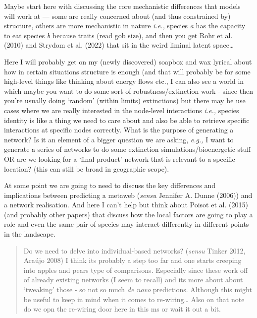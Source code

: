 \documentclass[
]{agujournal2019}
\begin{document}
Maybe start here with discussing the core mechanistic differences that
models will work at --- some are really concerned about (and thus
constrained by) structure, others are more mechanistic in nature
\emph{i.e.,} species \emph{a} has the capacity to eat species \emph{b}
because traits (read gob size), and then you get Rohr et al. (2010) and
Strydom et al. (2022) that sit in the weird liminal latent space\ldots{}

Here I will probably get on my (newly discovered) soapbox and wax
lyrical about how in certain situations structure is enough (and that
will probably be for some high-level things like thinking about energy
flows etc., I can also see a world in which maybe you want to do some
sort of robustness/extinction work - since then you're usually doing
`random' (within limits) extinctions) but there may be use cases where
we are really interested in the node-level interactions \emph{i.e.,}
species identity is like a thing we need to care about and also be able
to retrieve specific interactions at specific nodes correctly. What is
the purpose of generating a network? Is it an element of a bigger
question we are asking, \emph{e.g.,} I want to generate a series of
networks to do some extinction simulations/bioenergetic stuff OR are we
looking for a `final product' network that is relevant to a specific
location? (this can still be broad in geographic scope).

At some point we are going to need to discuss the key differences and
implications between predicting a metaweb (\emph{sensu} Jennifer A.
Dunne (2006)) and a network realisation. And here I can't help but think
about Poisot et al. (2015) (and probably other papers) that discuss how
the local factors are going to play a role and even the same pair of
species may interact differently in different points in the landscape.

\begin{quote}
Do we need to delve into individual-based networks? (\emph{sensu} Tinker
2012, Araújo 2008) I think its probably a step too far and one starts
creeping into apples and pears type of comparisons. Especially since
these work off of already existing networks (I seem to recall) and its
more about about `tweaking' those - so not so much \emph{de novo}
predictions. Although this might be useful to keep in mind when it comes
to re-wiring\ldots{} Also on that note do we opn the re-wiring door here
in this ms or wait it out a bit.
\end{quote}
\end{document}
